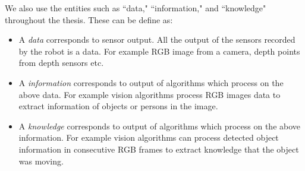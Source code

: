 We also use the entities such as ``data," ``information," and ``knowledge" throughout the thesis. These can be define as:
\begin{itemize}
	\item A \emph{data} corresponds to sensor output. All the output of the sensors recorded by the robot is a data. For example RGB image from a camera, depth points from depth sensors etc.
	\item A \emph{information} corresponds to output of algorithms which process on the above data. For example vision algorithms process RGB images data to extract information of objects or persons in the image.
	\item A \emph{knowledge} corresponds to output of algorithms which process on the above information. For example vision algorithms can process detected object information in consecutive RGB frames to extract knowledge that the object was moving.
\end{itemize}
